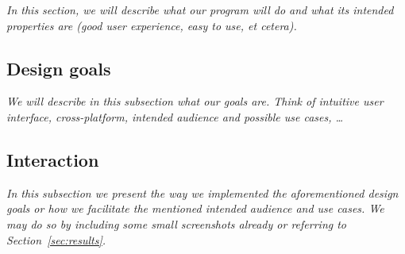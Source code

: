 \textit{In this section, we will describe what our program will do and what its intended properties are (good user experience, easy to use, et cetera).}

\subsection{Design goals}
\textit{We will describe in this subsection what our goals are. Think of intuitive user interface, cross-platform, intended audience and possible use cases, \ldots}

\subsection{Interaction}
\textit{In this subsection we present the way we implemented the aforementioned design goals or how we facilitate the mentioned intended audience and use cases. We may do so by including some small screenshots already or referring to Section~\ref{sec:results}.}